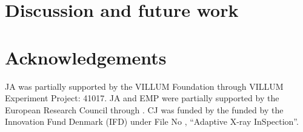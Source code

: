 \section{Discussion and future work}
\label{sec:conclusion}


\section{Acknowledgements}

JA was partially supported by the VILLUM Foundation through
VILLUM Experiment Project: 41017.
JA and EMP were partially supported by the European Research Council
through .
CJ was funded by the funded by the Innovation Fund Denmark (IFD) under File No
, ``Adaptive X-ray InSpection''.


